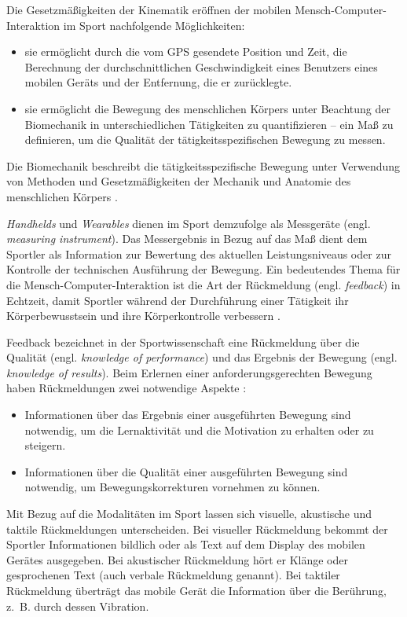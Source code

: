 Die Gesetzmäßigkeiten der Kinematik eröffnen der mobilen Mensch-Computer-Interaktion im Sport nachfolgende Möglichkeiten:

\begin{itemize}
	\item sie ermöglicht durch die vom \ac{GPS} gesendete Position und Zeit, die Berechnung der durchschnittlichen Geschwindigkeit eines Benutzers eines mobilen Geräts und der Entfernung, die er zurücklegte.
	\item sie ermöglicht die Bewegung des menschlichen Körpers unter Beachtung der Biomechanik in unterschiedlichen Tätigkeiten zu quantifizieren – ein Maß zu definieren, um die Qualität der tätigkeitsspezifischen Bewegung zu messen.
\end{itemize}

Die Biomechanik beschreibt die tätigkeitsspezifische Bewegung unter Verwendung von Methoden und Gesetzmäßigkeiten der Mechanik und Anatomie des menschlichen Körpers \citep[vgl.][ S.~2~ff.]{Winter2009}.

\emph{Handhelds} und \emph{Wearables} dienen im Sport demzufolge als Messgeräte (engl. \emph{measuring instrument}). Das Messergebnis in Bezug auf das Maß dient dem Sportler als Information zur Bewertung des aktuellen Leistungsniveaus oder zur Kontrolle der technischen Ausführung der Bewegung. Ein bedeutendes Thema für die Mensch-Computer-Interaktion ist die Art der Rückmeldung (engl. \emph{feedback}) in Echtzeit, damit Sportler während der Durchführung einer Tätigkeit ihr Körperbewusstsein und ihre Körperkontrolle verbessern \citep[vgl.][]{Nylander2014}.

Feedback bezeichnet in der Sportwissenschaft eine Rückmeldung über die Qualität (engl. \emph{knowledge of performance}) und das Ergebnis der Bewegung (engl. \emph{knowledge of results})\citep[vgl.][S.~482]{Riemer2015}. Beim Erlernen einer anforderungsgerechten Bewegung haben Rückmeldungen zwei notwendige Aspekte \citep[vgl.][S.~152]{Meinel2007}:

\begin{itemize}
	\item Informationen über das Ergebnis einer ausgeführten Bewegung sind notwendig, um die Lernaktivität und die Motivation zu erhalten oder zu steigern.
	\item Informationen über die Qualität einer ausgeführten Bewegung sind notwendig, um Bewegungskorrekturen vornehmen zu können.
\end{itemize}

Mit Bezug auf die Modalitäten im Sport lassen sich visuelle, akustische und taktile Rückmeldungen unterscheiden. Bei visueller Rückmeldung bekommt der Sportler Informationen bildlich oder als Text auf dem Display des mobilen Gerätes ausgegeben. Bei akustischer Rückmeldung hört er Klänge oder gesprochenen Text (auch verbale Rückmeldung genannt). Bei taktiler Rückmeldung überträgt das mobile Gerät die Information über die Berührung, z.~B. durch dessen Vibration.


